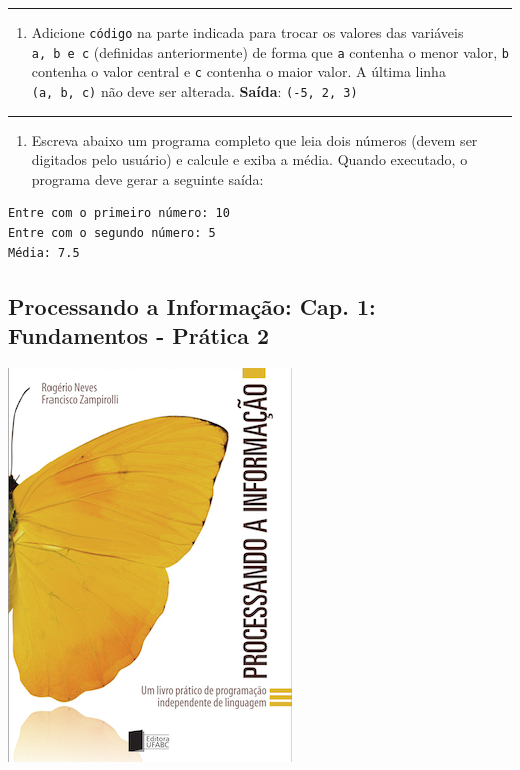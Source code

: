 \documentclass[12pt,a4paper]{article}
\renewcommand{\linethickness}{0.05em}
\providecommand{\tightlist}{%
      \setlength{\itemsep}{0pt}\setlength{\parskip}{0pt}}
\begin{document}
    \begin{center}\rule{0.5\linewidth}{\linethickness}\end{center}

\begin{enumerate}
\def\labelenumi{\arabic{enumi}.}
\setcounter{enumi}{3}
\tightlist
\item
  Adicione \texttt{código} na parte indicada para trocar os valores das
  variáveis \texttt{a,\ b\ e\ c} (definidas anteriormente) de forma que
  \texttt{a} contenha o menor valor, \texttt{b} contenha o valor central
  e \texttt{c} contenha o maior valor. A última linha
  \texttt{(a,\ b,\ c)} não deve ser alterada. \textbf{Saída}:
  \texttt{(-5,\ 2,\ 3)}
\end{enumerate}

    \begin{center}\rule{0.5\linewidth}{\linethickness}\end{center}

\begin{enumerate}
\def\labelenumi{\arabic{enumi}.}
\setcounter{enumi}{4}
\tightlist
\item
  Escreva abaixo um programa completo que leia dois números (devem ser
  digitados pelo usuário) e calcule e exiba a média. Quando executado, o
  programa deve gerar a seguinte saída:
\end{enumerate}

\begin{verbatim}
Entre com o primeiro número: 10
Entre com o segundo número: 5
Média: 7.5
\end{verbatim}

    \hypertarget{processando-a-informauxe7uxe3o-cap.-1-fundamentos---pruxe1tica-2}{%
\subsection{Processando a Informação: Cap. 1: Fundamentos - Prática
2}\label{processando-a-informauxe7uxe3o-cap.-1-fundamentos---pruxe1tica-2}}

    \includegraphics{"figs/Capa_Processando_Informacao.jpg"}
\end{document}
